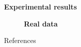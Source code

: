 \documentclass[english,final,t]{beamer}
\begin{document}
\begin{frame}{}
\begin{columns}[t]
\begin{column}{.3\linewidth}
\begin{block}{\textbf{\color{malgared}Experimental results}}
\begin{figure}[tb]
				\textbf{Real data}
			\end{figure}

			\vspace*{6cm}
			References
			\nocite{*}
			\normalsize
	\end{block}


	\end{column}
\end{columns}
\end{frame}
\end{document}
